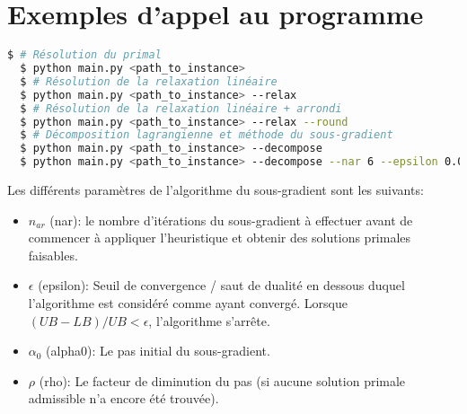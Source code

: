 \chapter{Exemples d'appel au programme}
\vspace*{1.2cm}

\begin{lstlisting}[language=bash]
  $ # Résolution du primal
  $ python main.py <path_to_instance>
  $ # Résolution de la relaxation linéaire
  $ python main.py <path_to_instance> --relax
  $ # Résolution de la relaxation linéaire + arrondi
  $ python main.py <path_to_instance> --relax --round
  $ # Décomposition lagrangienne et méthode du sous-gradient
  $ python main.py <path_to_instance> --decompose
  $ python main.py <path_to_instance> --decompose --nar 6 --epsilon 0.01 --alpha0 2000 --rho 0.96
\end{lstlisting}

Les différents paramètres de l'algorithme du sous-gradient sont les suivants:
\begin{itemize}
    \item $n_{ar}$ (nar): le nombre d'itérations du sous-gradient à effectuer avant de commencer à appliquer
    l'heuristique et obtenir des solutions primales faisables.
    \item $\epsilon$ (epsilon): Seuil de convergence / saut de dualité en dessous duquel l'algorithme est considéré comme
    ayant convergé. Lorsque $(UB - LB) / UB  < \epsilon$, l'algorithme s'arrête.
    \item $\alpha_0$ (alpha0): Le pas initial du sous-gradient.
    \item $\rho$ (rho): Le facteur de diminution du pas (si aucune solution primale admissible n'a encore été trouvée).
\end{itemize}